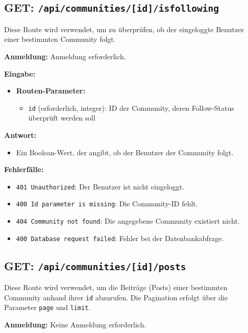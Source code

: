 \documentclass[a4paper,12pt]{article}
\begin{document}
\newpage
\subsection{GET: \texttt{/api/communities/[id]/isfollowing}}

Diese Route wird verwendet, um zu überprüfen, ob der eingeloggte Benutzer einer
bestimmten Community folgt.

\textbf{Anmeldung:} Anmeldung erforderlich.

\textbf{Eingabe:}
\begin{itemize}
    \item \textbf{Routen-Parameter:}
    \begin{itemize}
        \item \texttt{id} (erforderlich, integer):
            ID der Community, deren Follow-Status überprüft werden soll
    \end{itemize}
\end{itemize}

\textbf{Antwort:}
\begin{itemize}
    \item Ein Boolean-Wert, der angibt, ob der Benutzer der Community folgt.
\end{itemize}

\textbf{Fehlerfälle:}
\begin{itemize}
    \item \texttt{401 Unauthorized}:
        Der Benutzer ist nicht eingeloggt.
    \item \texttt{400 Id parameter is missing}:
        Die Community-ID fehlt.
    \item \texttt{404 Community not found}:
        Die angegebene Community existiert nicht.
    \item \texttt{400 Database request failed}:
        Fehler bei der Datenbankabfrage.
\end{itemize}

\newpage
\subsection{GET: \texttt{/api/communities/[id]/posts}}

Diese Route wird verwendet, um die Beiträge (Posts) einer bestimmten Community anhand ihrer \texttt{id} abzurufen. Die Pagination erfolgt über die Parameter \texttt{page} und \texttt{limit}.

\textbf{Anmeldung:} Keine Anmeldung erforderlich.
\end{document}
